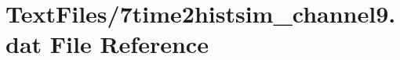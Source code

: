 \hypertarget{7time2histsim__channel9_8dat}{}\section{Text\+Files/7time2histsim\+\_\+channel9.dat File Reference}
\label{7time2histsim__channel9_8dat}
